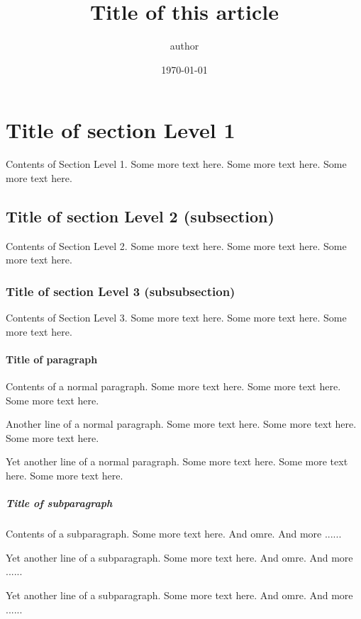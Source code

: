 \documentclass{article}
\title{Title of this article}
\author{author}
\date{\today}
\begin{document}
    \maketitle

    \section{Title of section Level 1}

        Contents of Section Level 1. Some more text here. Some more text here. Some more text here.

            \subsection{Title of section Level 2 (subsection)}

                Contents of Section Level 2. Some more text here. Some more text here. Some more text here.

                    \subsubsection{Title of section Level 3 (subsubsection)}

                        Contents of Section Level 3. Some more text here. Some more text here. Some more text here.

    \paragraph{Title of paragraph}

    Contents of a normal paragraph. Some more text here. Some more text here. Some more text here.

    Another line of a normal paragraph. Some more text here. Some more text here. Some more text here.

    Yet another line of a normal paragraph. Some more text here. Some more text here. Some more text here.

    \subparagraph{Title of subparagraph}

    Contents of a subparagraph. Some more text here. And omre. And more ......

    Yet another line of a subparagraph. Some more text here. And omre. And more ......

    Yet another line of a subparagraph. Some more text here. And omre. And more ......
\end{document}
